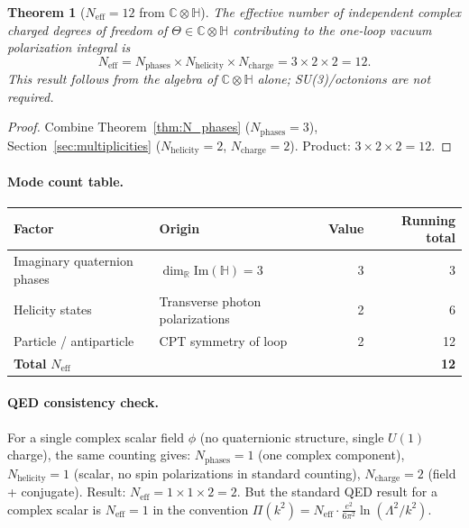 \documentclass[12pt,a4paper]{article}
\newtheorem{theorem}{Theorem}[section]
\theoremstyle{definition}
\theoremstyle{remark}
\newcommand{\C}{\mathbb{C}}
\newcommand{\R}{\mathbb{R}}
\renewcommand{\H}{\mathbb{H}}
\newcommand{\Neff}{N_{\mathrm{eff}}}
\begin{document}
\begin{theorem}[$\Neff = 12$ from $\C \otimes \H$]
\label{thm:Neff12}
The effective number of independent complex charged degrees of freedom
of $\Theta \in \C \otimes \H$ contributing to the one-loop vacuum polarization
integral is
\begin{equation}
  \boxed{\Neff = N_\mathrm{phases} \times N_\mathrm{helicity} \times N_\mathrm{charge}
  = 3 \times 2 \times 2 = 12.}
  \label{eq:Neff_12}
\end{equation}
This result follows from the algebra of $\C \otimes \H$ alone; SU(3)/octonions
are not required.
\end{theorem}

\begin{proof}
  Combine Theorem~\ref{thm:N_phases} ($N_\mathrm{phases} = 3$),
  Section~\ref{sec:multiplicities} ($N_\mathrm{helicity} = 2$,
  $N_\mathrm{charge} = 2$).
  Product: $3 \times 2 \times 2 = 12$.
\end{proof}

\paragraph{Mode count table.}
\begin{center}
\begin{tabular}{llrr}
  \toprule
  \textbf{Factor} & \textbf{Origin} & \textbf{Value} & \textbf{Running total} \\
  \midrule
  Imaginary quaternion phases & $\dim_\R \mathrm{Im}(\H) = 3$ & 3 & 3 \\
  Helicity states & Transverse photon polarizations & 2 & 6 \\
  Particle / antiparticle & CPT symmetry of loop & 2 & 12 \\
  \midrule
  \textbf{Total} $\Neff$ & & & \textbf{12} \\
  \bottomrule
\end{tabular}
\end{center}

\paragraph{QED consistency check.}
For a single complex scalar field $\phi$ (no quaternionic structure, single
$U(1)$ charge), the same counting gives:
$N_\mathrm{phases} = 1$ (one complex component),
$N_\mathrm{helicity} = 1$ (scalar, no spin polarizations in standard counting),
$N_\mathrm{charge} = 2$ (field + conjugate).
Result: $\Neff = 1 \times 1 \times 2 = 2$.  But the standard QED result for
a complex scalar is $\Neff = 1$ in the convention $\Pi(k^2) = \Neff \cdot
\frac{e^2}{6\pi^2}\ln(\Lambda^2/k^2)$.
\end{document}
